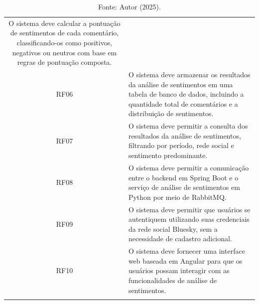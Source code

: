 \documentclass[
	12pt,				%
	oneside,			%
	a4paper,			%
	english,			%
	french,				%
	spanish,			%
	brazil				%
	]{abntex2}
\def\bottomrule{\hlineB{3}} %
\begin{document}
\begin{longtable}[]{|c|l|}
\begin{minipage}[t]{0.87\columnwidth}
O sistema deve calcular a pontuação de sentimentos de cada comentário, classificando-os como positivos, negativos ou neutros com base em regras de pontuação composta.\strut
\end{minipage}\tabularnewline
\begin{minipage}[t]{0.07\columnwidth}\centering
RF06\strut
\end{minipage} & \begin{minipage}[t]{0.87\columnwidth}\raggedright
O sistema deve armazenar os resultados da análise de sentimentos em uma tabela de banco de dados, incluindo a quantidade total de comentários e a distribuição de sentimentos.\strut
\end{minipage}\tabularnewline
\begin{minipage}[t]{0.07\columnwidth}\centering
RF07\strut
\end{minipage} & \begin{minipage}[t]{0.87\columnwidth}\raggedright
O sistema deve permitir a consulta dos resultados da análise de sentimentos, filtrando por período, rede social e sentimento predominante.\strut
\end{minipage}\tabularnewline
\begin{minipage}[t]{0.07\columnwidth}\centering
RF08\strut
\end{minipage} & \begin{minipage}[t]{0.87\columnwidth}\raggedright
O sistema deve permitir a comunicação entre o backend em Spring Boot e o serviço de análise de sentimentos em Python por meio de RabbitMQ.\strut
\end{minipage}\tabularnewline
\begin{minipage}[t]{0.07\columnwidth}\centering
RF09\strut
\end{minipage} & \begin{minipage}[t]{0.87\columnwidth}\raggedright
O sistema deve permitir que usuários se autentiquem utilizando suas credenciais da rede social Bluesky, sem a necessidade de cadastro adicional.\strut
\end{minipage}\tabularnewline
\begin{minipage}[t]{0.07\columnwidth}\centering
RF10\strut
\end{minipage} & \begin{minipage}[t]{0.87\columnwidth}\raggedright
O sistema deve fornecer uma interface web baseada em Angular para que os usuários possam interagir com as funcionalidades de análise de sentimentos.\strut
\end{minipage}\tabularnewline
\bottomrule
\caption*{Fonte: Autor (2025).}
\end{longtable}
\renewcommand\LTcaptype{table}
\end{document}

